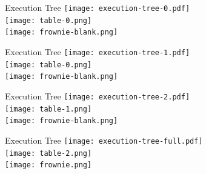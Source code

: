 \documentclass[xcolor=dvipsnames]{beamer}
\begin{document}
\begin{frame}{Execution Tree}
		\texttt{[image: execution-tree-0.pdf]} \\
		\vspace{-3in}
		\hspace{3in}
		\texttt{[image: table-0.png]}
		\\
		\vspace{1.2in}
		\hspace{3.7in}
		\texttt{[image: frownie-blank.png]}
\end{frame}
\begin{frame}{Execution Tree}
		\texttt{[image: execution-tree-1.pdf]} \\
		\vspace{-3in}
		\hspace{3in}
		\texttt{[image: table-0.png]}
		\\
		\vspace{1.2in}
		\hspace{3.7in}
		\texttt{[image: frownie-blank.png]}
\end{frame}
\begin{frame}{Execution Tree}
		\texttt{[image: execution-tree-2.pdf]} \\
		\vspace{-3in}
		\hspace{3in}
		\texttt{[image: table-1.png]}
		\\
		\vspace{1.2in}
		\hspace{3.7in}
		\texttt{[image: frownie-blank.png]}
\end{frame}
\begin{frame}{Execution Tree}
		\texttt{[image: execution-tree-full.pdf]} \\
		\vspace{-3in}
		\hspace{3in}
		\texttt{[image: table-2.png]}
		\\
		\vspace{1.2in}
		\hspace{3.7in}
		\texttt{[image: frownie.png]}
\end{frame}


\end{document}
